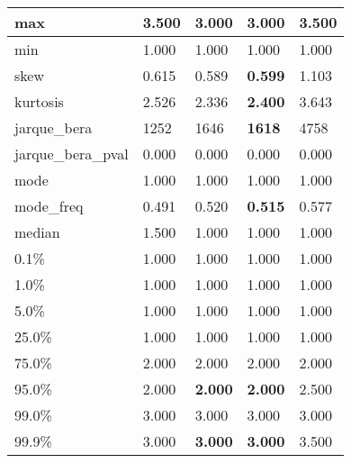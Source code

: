 \begin{table}[H]
\begin{tabular}{|l|m{10em}|m{10em}|m{10em}|m{10em}|}
\hline max & 3.500 & \cellcolor[rgb]{0.9, 0.54, 0.52} 3.000 & \cellcolor[rgb]{0.9, 0.54, 0.52} 3.000 & \bfseries 3.500 \\
\hline min & 1.000 & 1.000 & 1.000 & 1.000 \\
\hline skew & 0.615 & 0.589 & \bfseries 0.599 & \cellcolor[rgb]{0.9, 0.54, 0.52} 1.103 \\
\hline kurtosis & 2.526 & 2.336 & \bfseries 2.400 & \cellcolor[rgb]{0.9, 0.54, 0.52} 3.643 \\
\hline jarque\_bera & 1252 & 1646 & \bfseries 1618 & \cellcolor[rgb]{0.9, 0.54, 0.52} 4758 \\
\hline jarque\_bera\_pval & 0.000 & 0.000 & 0.000 & 0.000 \\
\hline mode & 1.000 & 1.000 & 1.000 & 1.000 \\
\hline mode\_freq & 0.491 & 0.520 & \bfseries 0.515 & \cellcolor[rgb]{0.9, 0.54, 0.52} 0.577 \\
\hline median & 1.500 & 1.000 & 1.000 & 1.000 \\
\hline 0.1\% & 1.000 & 1.000 & 1.000 & 1.000 \\
\hline 1.0\% & 1.000 & 1.000 & 1.000 & 1.000 \\
\hline 5.0\% & 1.000 & 1.000 & 1.000 & 1.000 \\
\hline 25.0\% & 1.000 & 1.000 & 1.000 & 1.000 \\
\hline 75.0\% & 2.000 & 2.000 & 2.000 & 2.000 \\
\hline 95.0\% & 2.000 & \bfseries 2.000 & \bfseries 2.000 & \cellcolor[rgb]{0.9, 0.54, 0.52} 2.500 \\
\hline 99.0\% & 3.000 & 3.000 & 3.000 & 3.000 \\
\hline 99.9\% & 3.000 & \bfseries 3.000 & \bfseries 3.000 & \cellcolor[rgb]{0.9, 0.54, 0.52} 3.500 \\
\hline
\end{tabular}
\end{table}
